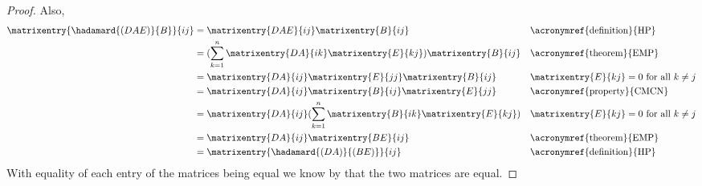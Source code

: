 \begin{proof}
Also,
\begin{align*}
\matrixentry{\hadamard{(DAE)}{B}}{ij}
&=
\matrixentry{DAE}{ij} \matrixentry{B}{ij}
&& \text{\acronymref{definition}{HP}} \\
%
&=
(\sum_{k=1}^n \matrixentry{DA}{ik} \matrixentry{E}{kj}) \matrixentry{B}{ij}
&& \text{\acronymref{theorem}{EMP}} \\
%
&=
\matrixentry{DA}{ij} \matrixentry{E}{jj} \matrixentry{B}{ij}
&& \matrixentry{E}{kj} = 0 \text{ for all } k \neq j \\
%
&=
\matrixentry{DA}{ij} \matrixentry{B}{ij} \matrixentry{E}{jj}
&& \text{\acronymref{property}{CMCN}} \\
%
&=
\matrixentry{DA}{ij} (\sum_{k=1}^n \matrixentry{B}{ik} \matrixentry{E}{kj} )
&& \matrixentry{E}{kj} = 0 \text{ for all } k \neq j \\
%
&=
\matrixentry{DA}{ij} \matrixentry{BE}{ij}
&& \text{\acronymref{theorem}{EMP}} \\
%
&=
\matrixentry{\hadamard{(DA)}{(BE)}}{ij}
&& \text{\acronymref{definition}{HP}}
\end{align*}
With equality of each entry of the matrices being equal we know by  that the two matrices are equal.
\end{proof}
%
